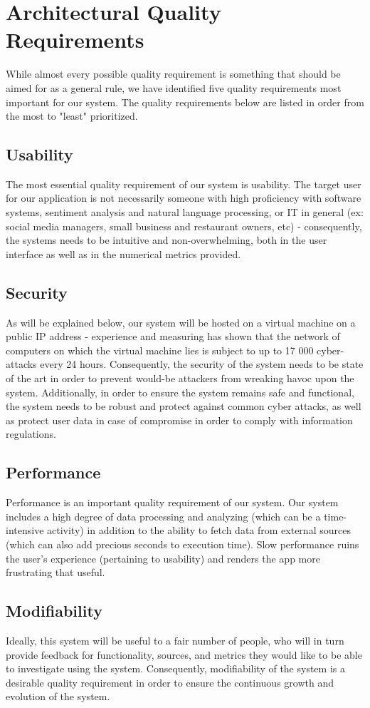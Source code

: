 \documentclass[12pt]{article}
\begin{document}
\newpage
\section{Architectural Quality Requirements}
While almost every possible quality requirement is something that should be aimed for as a general rule, we have identified five quality requirements most important for our system. The quality requirements below are listed in order from the most to "least" prioritized.
\subsection{Usability}
The most essential quality requirement of our system is usability. The target user for our application is not necessarily someone with high proficiency with software systems, sentiment analysis and natural language processing, or IT in general (ex: social media managers, small business and restaurant owners, etc) - consequently, the systems needs to be intuitive and non-overwhelming, both in the user interface as well as in the numerical metrics provided.
\subsection{Security}
As will be explained below, our system will be hosted on a virtual machine on a public IP address - experience and measuring has shown that the network of computers on which the virtual machine lies is subject to up to 17 000 cyber-attacks every 24 hours. Consequently, the security of the system needs to be state of the art in order to prevent would-be attackers from wreaking havoc upon the system. Additionally, in order to ensure the system remains safe and functional, the system needs to be robust and protect against common cyber attacks, as well as protect user data in case of compromise in order to comply with information regulations.
\subsection{Performance}
Performance is an important quality requirement of our system. Our system includes a high degree of data processing and analyzing (which can be a time-intensive activity) in addition to the ability to fetch data from external sources (which can also add precious seconds to execution time). Slow performance ruins the user's experience (pertaining to usability) and renders the app more frustrating that useful. 
\subsection{Modifiability}
Ideally, this system will be useful to a fair number of people, who will in turn provide feedback for functionality, sources, and metrics they would like to be able to investigate using the system. Consequently, modifiability of the system is a desirable quality requirement in order to ensure the continuous growth and evolution of the system. 
\end{document}
